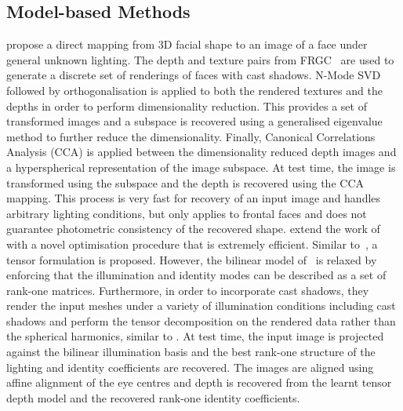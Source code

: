 \subsection{Model-based Methods}\label{subsec:bg_model_based_model}
\citet{minsik2013robust} propose a direct mapping from 3D facial shape to an
image of a face under general unknown lighting. The depth and texture pairs from
FRGC~\cite{phillips2005overview} are used to generate a discrete set of
renderings of faces with cast shadows. N-Mode
SVD~\cite{vasilescu2003multilinear} followed by orthogonalisation is applied to
both the rendered textures and the depths in order to perform dimensionality
reduction. This provides a set of transformed images and a subspace is recovered
using a generalised eigenvalue method to further reduce the dimensionality.
Finally, Canonical Correlations Analysis (CCA) is applied between the
dimensionality reduced depth images and a hyperspherical representation of the
image subspace. At test time, the image is transformed using the subspace and
the depth is recovered using the CCA mapping. This process is very fast for
recovery of an input image and handles arbitrary lighting conditions, but
only applies to frontal faces and does not guarantee photometric consistency
of the recovered shape.
\citet{minsik2014realtime} extend the work of \citet{minsik2011fast} with a
novel optimisation procedure that is extremely efficient. Similar
to~\cite{minsik2011fast}, a tensor formulation is proposed. However, the
bilinear model of~\cite{minsik2011fast} is relaxed by enforcing that the
illumination and identity modes can be described as a set of rank-one matrices.
Furthermore, in order to incorporate cast shadows, they render the input meshes
under a variety of illumination conditions including cast shadows and perform
the tensor decomposition on the rendered data rather than the spherical
harmonics, similar to \citet{minsik2013robust}. At test time, the input image
is projected against the bilinear illumination basis and the best rank-one
structure of the lighting and identity coefficients are recovered. The images
are aligned using affine alignment of the eye centres and depth is recovered
from the learnt tensor depth model and the recovered rank-one identity
coefficients.

